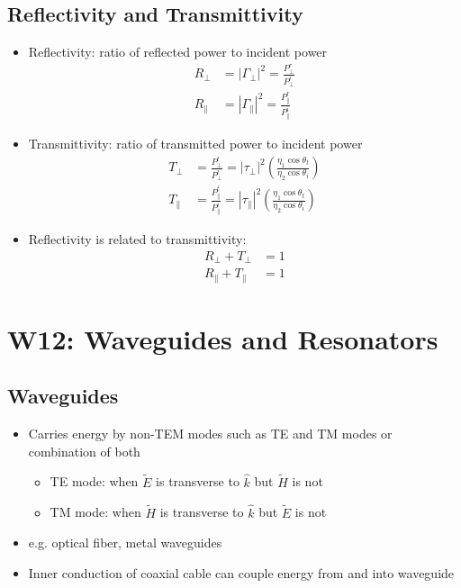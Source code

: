 \documentclass[a4paper]{article}
\begin{document}
\subsection{Reflectivity and Transmittivity}
\begin{itemize}
    \item Reflectivity: ratio of reflected power to incident power
    \begin{align*}
        R_\perp &= |\Gamma_\perp|^2 = \frac{P^r_\perp}{P^i_\perp}\\
        R_\parallel &= |\Gamma_\parallel|^2 = \frac{P^r_\parallel}{P^i_\parallel}
    \end{align*}
    \item Transmittivity: ratio of transmitted power to incident power
    \begin{align*}
        T_\perp &= \frac{P^t_\perp}{P^i_\perp} = |\tau_\perp|^2\left(\frac{\eta_1\cos\theta_t}{\eta_2\cos\theta_i}\right)\\
        T_\parallel &= \frac{P^t_\parallel}{P^i_\parallel} = |\tau_\parallel|^2\left(\frac{\eta_1\cos\theta_t}{\eta_2\cos\theta_i}\right)
    \end{align*}
    \item Reflectivity is related to transmittivity:
    \begin{align*}
        R_\perp + T_\perp &= 1\\
        R_\parallel + T_\parallel &= 1
    \end{align*}
\end{itemize}

\newpage
\section{W12: Waveguides and Resonators}

\subsection{Waveguides}
\begin{itemize}
    \item Carries energy by non-TEM modes such as TE and TM modes or combination of both
    \begin{itemize}[label=$\circ$]
        \item TE mode: when $\widetilde{E}$ is transverse to $\hat{k}$ but $\widetilde{H}$ is not
        \item TM mode: when $\widetilde{H}$ is transverse to $\hat{k}$ but $\widetilde{E}$ is not
    \end{itemize}
    \item e.g. optical fiber, metal waveguides
    \item Inner conduction of coaxial cable can couple energy from and into waveguide
\end{itemize}
\end{document}
